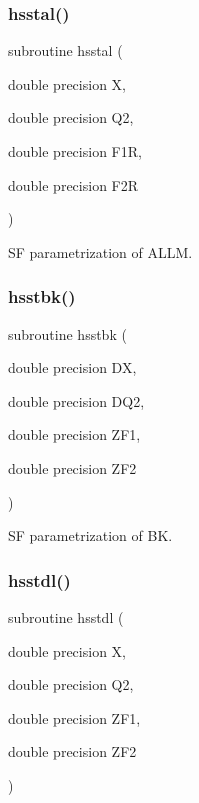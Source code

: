 \mbox{\label{djangoh__h_8f_aee7150f7f29148fca4b6631da45d4ece}} 
\subsubsection{\texorpdfstring{hsstal()}{hsstal()}}
{\footnotesize\ttfamily subroutine hsstal (\begin{DoxyParamCaption}\item[{double precision}]{X,  }\item[{double precision}]{Q2,  }\item[{double precision}]{F1R,  }\item[{double precision}]{F2R }\end{DoxyParamCaption})}



SF parametrization of A\+L\+LM. 

\mbox{\label{djangoh__h_8f_a82484cffd3d01a73064fd4603cfdd465}} 
\subsubsection{\texorpdfstring{hsstbk()}{hsstbk()}}
{\footnotesize\ttfamily subroutine hsstbk (\begin{DoxyParamCaption}\item[{double precision}]{DX,  }\item[{double precision}]{D\+Q2,  }\item[{double precision}]{Z\+F1,  }\item[{double precision}]{Z\+F2 }\end{DoxyParamCaption})}



SF parametrization of BK. 

\mbox{\label{djangoh__h_8f_a69a769d947e8150681e184e966997652}} 
\subsubsection{\texorpdfstring{hsstdl()}{hsstdl()}}
{\footnotesize\ttfamily subroutine hsstdl (\begin{DoxyParamCaption}\item[{double precision}]{X,  }\item[{double precision}]{Q2,  }\item[{double precision}]{Z\+F1,  }\item[{double precision}]{Z\+F2 }\end{DoxyParamCaption})}



